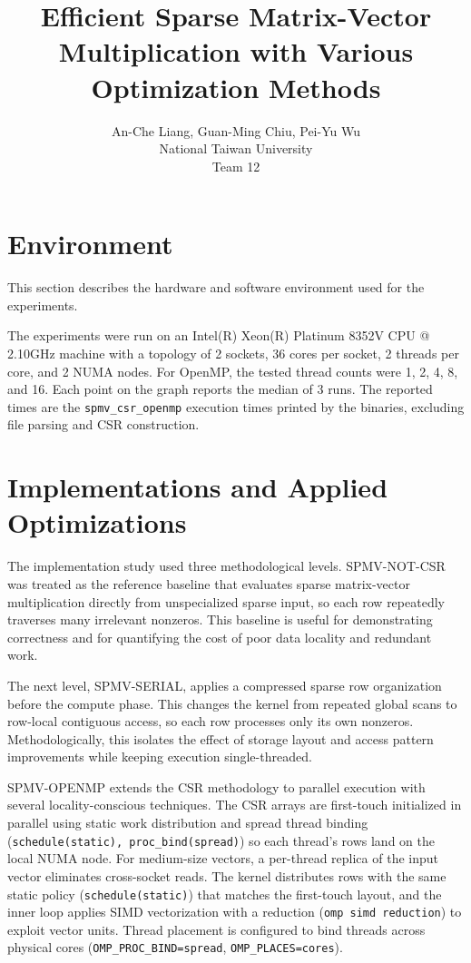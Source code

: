 \documentclass{article}
\title{Efficient Sparse Matrix-Vector Multiplication with Various Optimization Methods}
\author{%
  An-Che Liang, Guan-Ming Chiu, Pei-Yu Wu\\
  National Taiwan University\\
  Team 12\\
}
\begin{document}
\maketitle

\section{Environment}

This section describes the hardware and software environment used for the experiments.

The experiments were run on an Intel(R) Xeon(R) Platinum 8352V CPU @ 2.10GHz machine with a topology of 2 sockets, 36 cores per socket, 2 threads per core, and 2 NUMA nodes. For OpenMP, the tested thread counts were 1, 2, 4, 8, and 16. Each point on the graph reports the median of 3 runs. The reported times are the \texttt{spmv\_csr\_openmp} execution times printed by the binaries, excluding file parsing and CSR construction.

\section{Implementations and Applied Optimizations}

The implementation study used three methodological levels. SPMV-NOT-CSR was treated as the reference baseline that evaluates sparse matrix-vector multiplication directly from unspecialized sparse input, so each row repeatedly traverses many irrelevant nonzeros. This baseline is useful for demonstrating correctness and for quantifying the cost of poor data locality and redundant work.

The next level, SPMV-SERIAL, applies a compressed sparse row organization before the compute phase. This changes the kernel from repeated global scans to row-local contiguous access, so each row processes only its own nonzeros. Methodologically, this isolates the effect of storage layout and access pattern improvements while keeping execution single-threaded.

SPMV-OPENMP extends the CSR methodology to parallel execution with several locality-conscious techniques. The CSR arrays are first-touch initialized in parallel using static work distribution and spread thread binding (\texttt{schedule(static), proc\_bind(spread)}) so each thread's rows land on the local NUMA node. For medium-size vectors, a per-thread replica of the input vector eliminates cross-socket reads. The kernel distributes rows with the same static policy (\texttt{schedule(static)}) that matches the first-touch layout, and the inner loop applies SIMD vectorization with a reduction (\texttt{omp simd reduction}) to exploit vector units. Thread placement is configured to bind threads across physical cores (\texttt{OMP\_PROC\_BIND=spread}, \texttt{OMP\_PLACES=cores}).
\end{document}
